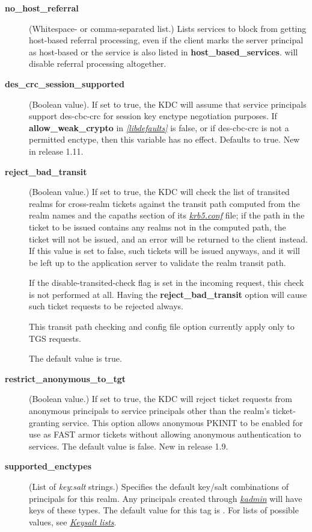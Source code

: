 \documentclass[letterpaper,10pt,english]{sphinxmanual}
\begin{document}
\begin{description}
\item[{\textbf{no\_host\_referral}}] \leavevmode
(Whitespace- or comma-separated list.)  Lists services to block
from getting host-based referral processing, even if the client
marks the server principal as host-based or the service is also
listed in \textbf{host\_based\_services}.   will
disable referral processing altogether.

\item[{\textbf{des\_crc\_session\_supported}}] \leavevmode
(Boolean value).  If set to true, the KDC will assume that service
principals support des-cbc-crc for session key enctype negotiation
purposes.  If \textbf{allow\_weak\_crypto} in {\hyperref[admin/conf_files/krb5_conf:libdefaults]{\emph{{[}libdefaults{]}}}} is
false, or if des-cbc-crc is not a permitted enctype, then this
variable has no effect.  Defaults to true.  New in release 1.11.

\item[{\textbf{reject\_bad\_transit}}] \leavevmode
(Boolean value.)  If set to true, the KDC will check the list of
transited realms for cross-realm tickets against the transit path
computed from the realm names and the capaths section of its
{\hyperref[admin/conf_files/krb5_conf:krb5-conf-5]{\emph{krb5.conf}}} file; if the path in the ticket to be issued
contains any realms not in the computed path, the ticket will not
be issued, and an error will be returned to the client instead.
If this value is set to false, such tickets will be issued
anyways, and it will be left up to the application server to
validate the realm transit path.

If the disable-transited-check flag is set in the incoming
request, this check is not performed at all.  Having the
\textbf{reject\_bad\_transit} option will cause such ticket requests to
be rejected always.

This transit path checking and config file option currently apply
only to TGS requests.

The default value is true.

\item[{\textbf{restrict\_anonymous\_to\_tgt}}] \leavevmode
(Boolean value.)  If set to true, the KDC will reject ticket
requests from anonymous principals to service principals other
than the realm's ticket-granting service.  This option allows
anonymous PKINIT to be enabled for use as FAST armor tickets
without allowing anonymous authentication to services.  The
default value is false.  New in release 1.9.

\item[{\textbf{supported\_enctypes}}] \leavevmode
(List of \emph{key}:\emph{salt} strings.)  Specifies the default key/salt
combinations of principals for this realm.  Any principals created
through {\hyperref[admin/admin_commands/kadmin_local:kadmin-1]{\emph{kadmin}}} will have keys of these types.  The
default value for this tag is .  For lists of
possible values, see {\hyperref[admin/conf_files/kdc_conf:keysalt-lists]{\emph{Keysalt lists}}}.

\end{description}
\end{document}
